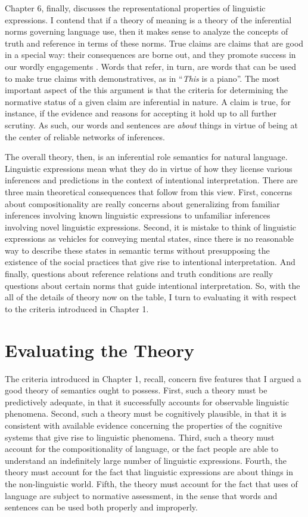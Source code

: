 Chapter 6, finally, discusses the representational properties of linguistic expressions. I contend that if a theory of meaning is a theory of the inferential norms governing language use, then it makes sense to analyze the concepts of truth and reference in terms of these norms. True claims are claims that are good in a special way: their consequences are borne out, and they promote success in our wordly engagements \citep{Peirce:1992,Misak:2013,Misak:2007}. Words that refer, in turn, are words that can be used to make true claims with demonstratives, as in ``\textit{This} is a piano''. The most important aspect of the this argument is that the criteria for determining the normative status of a given claim are inferential in nature. A claim is true, for instance, if the evidence and reasons for accepting it hold up to all further scrutiny. As such, our words and sentences are \textit{about} things in virtue of being at the center of reliable networks of inferences.

The overall theory, then, is an inferential role semantics for natural language. Linguistic expressions mean what they do in virtue of how they license various inferences and predictions in the context of intentional interpretation. There are three main theoretical consequences that follow from this view. First, concerns about compositionality are really concerns about generalizing from familiar inferences involving known linguistic expressions to unfamiliar inferences involving novel linguistic expressions. Second, it is mistake to think of linguistic expressions as vehicles for conveying mental states, since there is no reasonable way to describe these states in semantic terms without presupposing the existence of the social practices that give rise to intentional interpretation. And finally, questions about reference relations and truth conditions are really questions about certain norms that guide intentional interpretation. So, with the all of the details of theory now on the table, I turn to evaluating it with respect to the criteria introduced in Chapter 1. 

\section{Evaluating the Theory}

The criteria introduced in Chapter 1, recall, concern five features that I argued a good theory of semantics ought to possess. First, such a theory must be predictively adequate, in that it successfully accounts for observable linguistic phenomena. Second, such a theory must be cognitively plausible, in that it is consistent with available evidence concerning the properties of the cognitive systems that give rise to linguistic phenomena. Third, such a theory must account for the compositionality of language, or the fact people are able to understand an indefinitely large number of linguistic expressions. Fourth, the theory must account for the fact that linguistic expressions are about things in the non-linguistic world. Fifth, the theory must account for the fact that uses of language are subject to normative assessment, in the sense that words and sentences can be used both properly and improperly.


